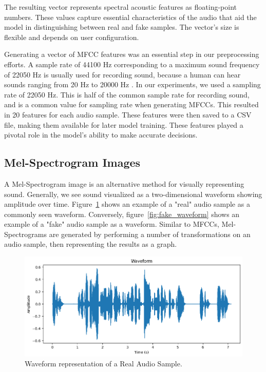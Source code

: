 \documentclass[sigconf,authordraft]{acmart}
\begin{document}
The resulting vector represents spectral acoustic features as floating-point numbers. These values capture essential characteristics of the audio that aid the model in distinguishing between real and fake samples. The vector's size is flexible and depends on user configuration. 

Generating a vector of MFCC features was an essential step in our preprocessing efforts. A sample rate of 44100 Hz corresponding to a maximum sound frequency of 22050 Hz is usually used for recording sound, because a human can hear sounds ranging from 20 Hz to 20000 Hz \cite{9252126}. In our experiments, we used a sampling rate of 22050 Hz. This is half of the common sample rate for recording sound, and is a common value for sampling rate when generating MFCCs. This resulted in 20 features for each audio sample. These features were then saved to a CSV file, making them available for later model training. These features played a pivotal role in the model's ability to make accurate decisions.

\subsection{Mel-Spectrogram Images}
A Mel-Spectrogram image is an alternative method for visually representing sound. Generally, we see sound visualized as a two-dimensional waveform showing amplitude over time. Figure~\ref{fig:real_waveform} shows an example of a "real" audio sample as a commonly seen waveform. Conversely, figure~\ref{fig:fake_waveform} shows an example of a "fake" audio sample as a waveform. Similar to MFCCs, Mel-Spectrograms are generated by performing a number of transformations on an audio sample, then representing the results as a graph. 

\begin{figure}
  \centering
  \includegraphics[width=\linewidth]{images/real_waveform.png}
  \caption{Waveform representation of a Real Audio Sample.}
  \label{fig:real_waveform}
\end{figure}
\end{document}
